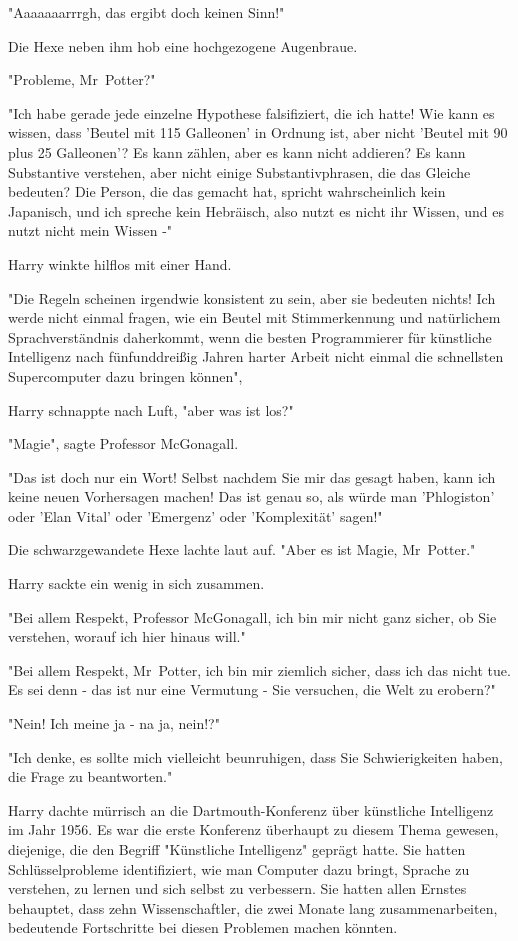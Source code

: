 {"Aaaaaaarrrgh, das ergibt doch keinen Sinn!"

Die Hexe neben ihm hob eine hochgezogene Augenbraue.

"Probleme, Mr~Potter?"

"Ich habe gerade jede einzelne Hypothese falsifiziert, die ich hatte! Wie kann es wissen, dass 'Beutel mit 115 Galleonen' in Ordnung ist, aber nicht 'Beutel mit 90 plus 25 Galleonen'? Es kann zählen, aber es kann nicht addieren? Es kann Substantive verstehen, aber nicht einige Substantivphrasen, die das Gleiche bedeuten? Die Person, die das gemacht hat, spricht wahrscheinlich kein Japanisch, und ich spreche kein Hebräisch, also nutzt es nicht ihr Wissen, und es nutzt nicht mein Wissen -"

Harry winkte hilflos mit einer Hand.

"Die Regeln scheinen irgendwie konsistent zu sein, aber sie bedeuten nichts! Ich werde nicht einmal fragen, wie ein Beutel mit Stimmerkennung und natürlichem Sprachverständnis daherkommt, wenn die besten Programmierer für künstliche Intelligenz nach fünfunddreißig Jahren harter Arbeit nicht einmal die schnellsten Supercomputer dazu bringen können",

Harry schnappte nach Luft, "aber was ist los?"

"Magie", sagte Professor McGonagall.

"Das ist doch nur ein Wort! Selbst nachdem Sie mir das gesagt haben, kann ich keine neuen Vorhersagen machen! Das ist genau so, als würde man 'Phlogiston' oder 'Elan Vital' oder 'Emergenz' oder 'Komplexität' sagen!"

Die schwarzgewandete Hexe lachte laut auf. "Aber es ist Magie, Mr~Potter."

Harry sackte ein wenig in sich zusammen.

"Bei allem Respekt, Professor McGonagall, ich bin mir nicht ganz sicher, ob Sie verstehen, worauf ich hier hinaus will."

"Bei allem Respekt, Mr~Potter, ich bin mir ziemlich sicher, dass ich das nicht tue. Es sei denn - das ist nur eine Vermutung - Sie versuchen, die Welt zu erobern?"

"Nein! Ich meine ja - na ja, nein!?"

"Ich denke, es sollte mich vielleicht beunruhigen, dass Sie Schwierigkeiten haben, die Frage zu beantworten."

Harry dachte mürrisch an die Dartmouth-Konferenz über künstliche Intelligenz im Jahr 1956. Es war die erste Konferenz überhaupt zu diesem Thema gewesen, diejenige, die den Begriff "Künstliche Intelligenz" geprägt hatte. Sie hatten Schlüsselprobleme identifiziert, wie man Computer dazu bringt, Sprache zu verstehen, zu lernen und sich selbst zu verbessern. Sie hatten allen Ernstes behauptet, dass zehn Wissenschaftler, die zwei Monate lang zusammenarbeiten, bedeutende Fortschritte bei diesen Problemen machen könnten.

}
